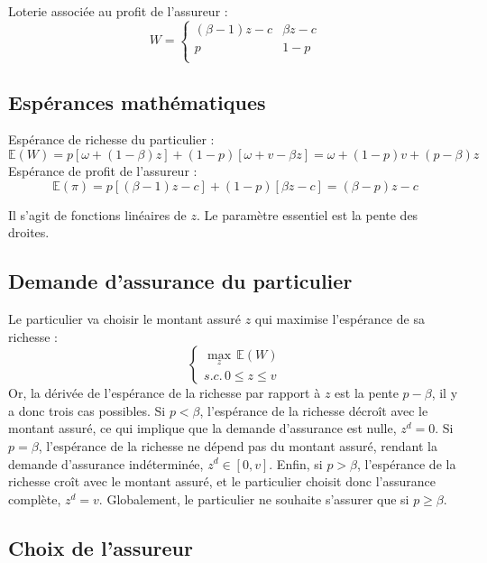 \documentclass[a4paper, 12pt]{report}
\begin{document}
Loterie associée au profit de l'assureur :
$$
W= \left\{\begin{matrix}
	(\beta-1)z-c & \beta z-c \\
	p & 1-p \\
\end{matrix}\right.
$$

\subsection{Espérances mathématiques}

Espérance de richesse du particulier :
$$
\mathbb{E}(W)=p[\omega+(1-\beta)z]+(1-p)[\omega+v-\beta z]=\omega+(1-p)v+(p-\beta)z
$$
Espérance de profit de l'assureur :
$$
\mathbb{E}(\pi)=p[(\beta-1)z-c]+(1-p)[\beta z-c]=(\beta-p)z-c
$$

Il s'agit de fonctions linéaires de $z$. Le paramètre essentiel est la pente des droites.

\subsection{Demande d'assurance du particulier}

Le particulier va choisir le montant assuré $z$ qui maximise l'espérance de sa richesse :
$$
\begin{cases}\underset{z}\max \,\mathbb{E}(W)\\ s.c. \,0 \le z\le v\end{cases}
$$
Or, la dérivée de l'espérance de la richesse par rapport à \( z \) est la pente \( p - \beta \), il y a donc trois cas possibles. Si \( p < \beta \), l'espérance de la richesse décroît avec le montant assuré, ce qui implique que la demande d'assurance est nulle, \( z^d = 0 \). Si \( p = \beta \), l'espérance de la richesse ne dépend pas du montant assuré, rendant la demande d'assurance indéterminée, \( z^d \in [0, v] \). Enfin, si \( p > \beta \), l'espérance de la richesse croît avec le montant assuré, et le particulier choisit donc l'assurance complète, \( z^d = v \). Globalement, le particulier ne souhaite s'assurer que si \( p \geq \beta \).

\subsection{Choix de l'assureur}
\end{document}
